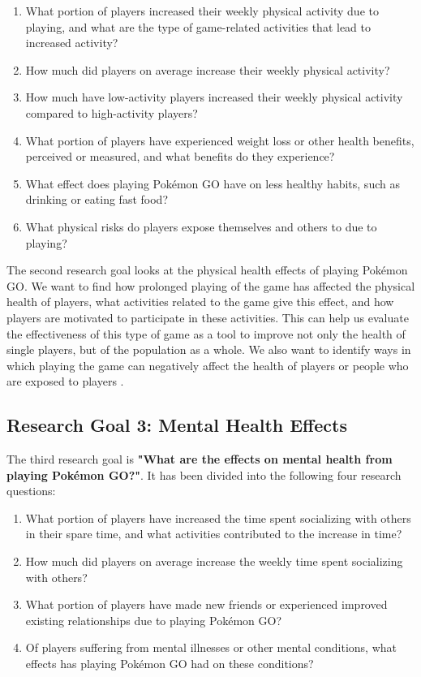 \begin{enumerate}[label=RQ2.{\arabic*}]
	\item What portion of players increased their weekly physical activity due to playing, and what are the type of game-related activities that lead to increased activity?\label{RQ2.1}
	\item How much did players on average increase their weekly physical activity?\label{RQ2.2}
	\item How much have low-activity players increased their weekly physical activity compared to high-activity players?\label{RQ2.3}
	\item What portion of players have experienced weight loss or other health benefits, perceived or measured, and what benefits do they experience?\label{RQ2.4}
	\item What effect does playing Pokémon GO have on less healthy  habits, such as drinking or eating fast food?\label{RQ2.5}
	\item What physical risks do players expose themselves and others to due to playing?\label{RQ2.6}
\end{enumerate}

The second research goal looks at the physical health effects of playing Pokémon GO. We want to find how prolonged playing of the game has affected the physical health of players, what activities related to the game give this effect, and how players are motivated to participate in these activities. This can help us evaluate the effectiveness of this type of game as a tool to improve not only the health of single players, but of the population as a whole. We also want to identify ways in which playing the game can negatively affect the health of players or people who are exposed to players .

\subsection{Research Goal 3: Mental Health Effects}
\label{rg3}

The third research goal is \textbf{"What are the effects on mental health from playing Pokémon GO?"}. It has been divided into the following four research questions:

\begin{enumerate}[label=RQ3.{\arabic*}]
	\item What portion of players have increased the time spent socializing with others in their spare time, and what activities contributed to the increase in time?\label{RQ3.1}
	\item How much did players on average increase the weekly time spent socializing with others?\label{RQ3.2}
	\item What portion of players have made new friends or experienced improved existing relationships due to playing Pokémon GO?\label{RQ3.3}
	\item Of players suffering from mental illnesses or other mental conditions, what effects has playing Pokémon GO had on these conditions?\label{RQ3.4}
\end{enumerate}

